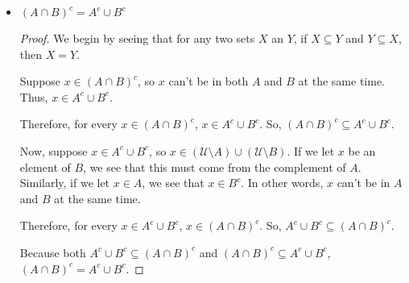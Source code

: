 \documentclass{article}
\begin{document}
\begin{enumerate}
{\begin{itemize}
{\begin{proof}
                    Suppose \(x \in (A \cup B)^c\), so \(x \not\in A\), and thus \(x \in A^c\). 
                    Similarly,  \(x \not\in B\), and thus \(x \in B^c\).

                    Therefore, for every \(x \in (A \cup B)^c\), \(x \in A^c \cap B^c\).
                    So, \((A \cup B)^c \subseteq A^c \cap B^c\).

                    Now, suppose \(x \in A^c \cap B^c\), so \(x \not\in A\), and thus \(x \in A^c\). 
                    Similarly,  \(x \not\in B\), and thus \(x \in B^c\).

                    Therefore, for every \(x \in A^c \cap B^c\), \(x \in (A \cup B)^c\).
                    So, \( A^c \cap B^c \subseteq (A \cup B)^c \).

                    Because both \( A^c \cap B^c \subseteq (A \cup B)^c \) and 
                    \((A \cup B)^c \subseteq A^c \cap B^c\), \((A \cup B)^c = A^c \cap B^c\).
                \end{proof}
            }

            \item 
                \((A \cap B)^c = A^c \cup B^c\)
                \begin{proof}
                    We begin by seeing that for any two sets \(X\) an \(Y\), if \(X \subseteq Y\) 
                    and \(Y \subseteq X\), then \(X = Y\).

                    Suppose \(x \in (A \cap B)^c\), so \(x\) can't be in both \(A\) 
                    and \(B\) at the same time. Thus, \(x \in A^c \cup B^c\).

                    Therefore, for every \(x \in (A \cap B)^c\), \(x \in A^c \cup B^c\).
                    So, \((A \cap B)^c \subseteq A^c \cup B^c\).

                    Now, suppose \(x \in A^c \cup B^c\), so \(x \in (\mathcal{U} \setminus A) \cup(\mathcal{U} \setminus B) \).
                    If we let \(x\) be an element of \(B\), we see that this must come from the complement of \(A\).
                    Similarly, if we let \(x \in A\), we see that \(x \in B^c\).
                    In other words, \(x\) can't be in \(A\) and \(B\) at the same time. 

                    Therefore, for every \(x \in A^c \cup B^c\), \(x \in (A \cap B)^c\).
                    So, \( A^c \cup B^c \subseteq (A \cap B)^c \).

                    Because both \( A^c \cup B^c \subseteq (A \cap B)^c \) and 
                    \((A \cap B)^c \subseteq A^c \cup B^c\), \((A \cap B)^c = A^c \cup B^c\).
                \end{proof}
        \end{itemize}
    }
\end{enumerate}
\end{document}
